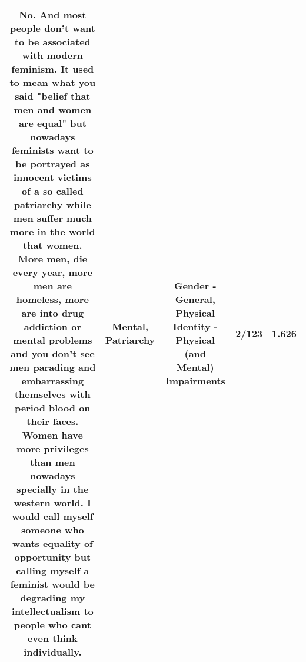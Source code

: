 \documentclass[11pt]{article}
\newlength\mylength
\begin{document}
\begin{center}
\begin{longtable}{|C{.65\mylength}|C{.30\mylength}|C{.12\mylength}|C{.12\mylength}|C{.12\mylength}|}
  \small {} No. And most people don't want to be associated with modern feminism. It used to mean what you said "belief that men and women are equal" but nowadays feminists want to be portrayed as innocent victims of a so called \textbf{patriarchy} while men suffer much more in the world that women. More men, die every year, more men are homeless, more are into drug addiction or \textbf{mental} problems and you don't see men parading and embarrassing themselves with period blood on their faces. Women have more privileges than men nowadays specially in the western world. I would call myself someone who wants equality of opportunity but calling myself a feminist would be degrading my intellectualism to people who cant even think individually.\normalsize   & Mental, Patriarchy & Gender - General, Physical Identity - Physical (and Mental) Impairments & 2/123 & 1.626 \\  \hline

\end{longtable}
\end{center}
\end{document}
